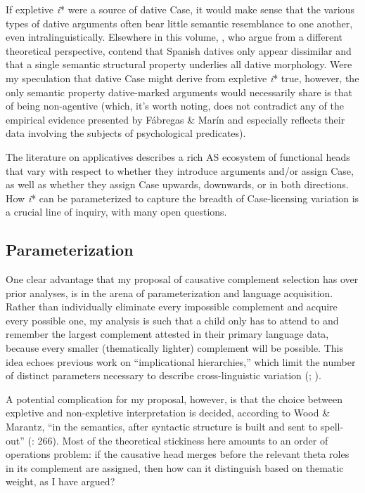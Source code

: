 \documentclass[output=paper,modfonts,nonflat,colorlinks,citecolor=brown]{langsci/langscibook}
\begin{document}
If expletive \textit{i}* were a source of dative Case, it would make sense that the various types of dative arguments often bear little semantic resemblance to one another, even intralinguistically. Elsewhere in this volume, , who argue from a different theoretical perspective, contend that Spanish datives only appear dissimilar and that a single semantic structural property underlies all dative morphology. Were my speculation that dative Case might derive from expletive \textit{i}* true, however, the only semantic property dative-marked arguments would necessarily share is that of being non-agentive (which, it’s worth noting, does not contradict any of the empirical evidence presented by Fábregas \& Marín and especially reflects their data involving the subjects of psychological predicates).



The literature on applicatives describes a rich AS ecosystem of functional heads that vary with respect to whether they introduce arguments and/or assign Case, as well as whether they assign Case upwards, downwards, or in both directions. How \textit{i}* can be parameterized to capture the breadth of Case-licensing variation is a crucial line of inquiry, with many open questions.

\subsection{Parameterization}\label{sec:wechsler:4.3}

One clear advantage that my proposal of causative complement selection has over prior analyses, is in the arena of parameterization and language acquisition. Rather than individually eliminate every impossible complement and acquire every possible one, my analysis is such that a child only has to attend to and remember the largest complement attested in their primary language data, because every smaller (thematically lighter) complement will be possible. This idea echoes previous work on “implicational hierarchies,” which limit the number of distinct parameters necessary to describe cross-linguistic variation (\citealt{HolmbergRoberts2009,Biberauer2011,BiberauerRoberts2012significance,BiberauerRoberts2015,Sheehan2013,BiberauerEtAl2013}; \citealt{WalBiberauer2014,BiberauerEtAl2014,vanderWal2017}).

A potential complication for my proposal, however, is that the choice between expletive and non-expletive interpretation is decided, according to Wood \& Marantz, “in the semantics, after syntactic structure is built and sent to spell-out” (\citeyear{WoodMarantz2017}: 266). Most of the theoretical stickiness here amounts to an order of operations problem: if the causative head merges before the relevant theta roles in its complement are assigned, then how can it distinguish based on thematic weight, as I have argued?
\end{document}
